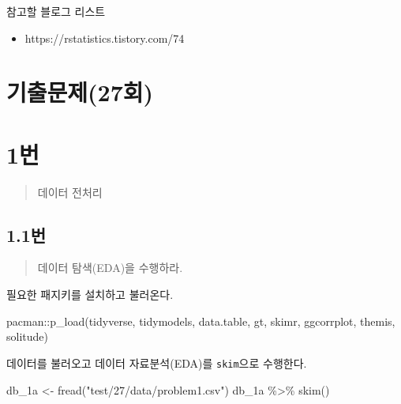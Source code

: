 \documentclass[
  letterpaper,
  DIV=11,
  numbers=noendperiod]{scrreprt}
\newenvironment{Shaded}{\begin{snugshade}}{\end{snugshade}}
\newcommand{\FunctionTok}[1]{\textcolor[rgb]{0.28,0.35,0.67}{#1}}
\newcommand{\NormalTok}[1]{\textcolor[rgb]{0.00,0.23,0.31}{#1}}
\newcommand{\OtherTok}[1]{\textcolor[rgb]{0.00,0.23,0.31}{#1}}
\newcommand{\SpecialCharTok}[1]{\textcolor[rgb]{0.37,0.37,0.37}{#1}}
\newcommand{\StringTok}[1]{\textcolor[rgb]{0.13,0.47,0.30}{#1}}
\providecommand{\tightlist}{%
  \setlength{\itemsep}{0pt}\setlength{\parskip}{0pt}}\usepackage{longtable,booktabs,array}
\begin{document}
참고할 블로그 리스트

\begin{itemize}
\tightlist
\item
  https://rstatistics.tistory.com/74
\end{itemize}

\hypertarget{uxae30uxcd9cuxbb38uxc81c27uxd68c}{%
\chapter*{기출문제(27회)}\label{uxae30uxcd9cuxbb38uxc81c27uxd68c}}


\hypertarget{uxbc88}{%
\chapter*{1번}\label{uxbc88}}


\begin{quote}
데이터 전처리
\end{quote}

\hypertarget{uxbc88-1}{%
\section*{1.1번}\label{uxbc88-1}}


\begin{quote}
데이터 탐색(EDA)을 수행하라.
\end{quote}

필요한 패지키를 설치하고 불러온다.

\begin{Shaded}
\begin{Highlighting}[]
\NormalTok{pacman}\SpecialCharTok{::}\FunctionTok{p\_load}\NormalTok{(tidyverse, tidymodels, data.table, gt, }
\NormalTok{               skimr, ggcorrplot, themis, solitude)}
\end{Highlighting}
\end{Shaded}

데이터를 불러오고 데이터 자료분석(EDA)를 \texttt{skim}으로 수행한다.

\begin{Shaded}
\begin{Highlighting}[]
\NormalTok{db\_1a }\OtherTok{\textless{}{-}} \FunctionTok{fread}\NormalTok{(}\StringTok{"test/27/data/problem1.csv"}\NormalTok{)}
\NormalTok{db\_1a }\SpecialCharTok{\%\textgreater{}\%} \FunctionTok{skim}\NormalTok{()}
\end{Highlighting}
\end{Shaded}
\end{document}
